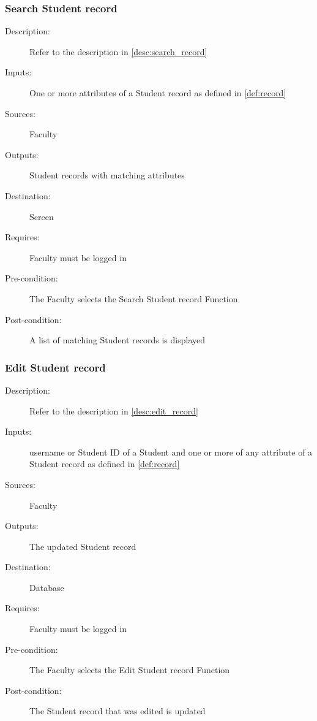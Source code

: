 \subsubsection{\large Search Student record} 
\begin{boxed} %
\begin{description}
\item[Description:]
   Refer to the description in \autoref{desc:search_record}
\item[Inputs:]
   One or more attributes of a Student record as defined in \autoref{def:record}
\item[Sources:]
   Faculty
\item[Outputs:]
   Student records with matching attributes
\item[Destination:]
   Screen
\item[Requires:]
   Faculty must be logged in
\item[Pre-condition:]
   The Faculty selects the Search Student record Function
\item[Post-condition:]
   A list of matching Student records is displayed
\end{description}
\end{boxed} %

\subsubsection{\large Edit Student record} 
\begin{boxed} %
\begin{description}
\item[Description:]
   Refer to the description in \autoref{desc:edit_record}
\item[Inputs:]
   username or Student ID of a Student and one or more of any
   attribute of a Student record as defined in \autoref{def:record}
\item[Sources:]
   Faculty
\item[Outputs:]
   The updated Student record
\item[Destination:]
   Database
\item[Requires:]
   Faculty must be logged in
\item[Pre-condition:]
   The Faculty selects the Edit Student record Function
\item[Post-condition:]
   The Student record that was edited is updated
\end{description}
\end{boxed} %

